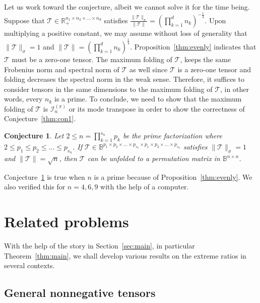 \documentclass[11pt]{article}
\newtheorem{conjecture}[theorem]{Conjecture}
\newcommand{\BB}{\mathbb{B}}
\newcommand{\R}{\mathbb{R}}
\newcommand{\II}{\mathcal{I}}
\newcommand{\TT}{\mathcal{T}}
\begin{document}
Let us work toward the conjecture, albeit we cannot solve it for the time being. Suppose that $\TT\in\R_+^{n_1\times n_2\times \dots\times n_d}$ satisfies $\frac{\|\TT\|_\sigma}{\|\TT\|}=\left(\prod_{k=1}^dn_k\right)^{-\frac{1}{4}}$. Upon multiplying a positive constant, we may assume without loss of generality that $\|\TT\|_\sigma=1$ and $\|\TT\|=\left(\prod_{k=1}^dn_k\right)^{\frac{1}{4}}$. Proposition~\ref{thm:evenly} indicates that $\TT$ must be a zero-one tensor. The maximum folding of $\TT$, keeps the same Frobenius norm and spectral norm of $\TT$ as well since $\TT$ is a zero-one tensor and folding decreases the spectral norm in the weak sense. Therefore, it suffices to consider tensors in the same dimensions to the maximum folding of $\TT$, in other words, every $n_k$ is a prime. To conclude, we need to show that the maximum folding of $\TT$ is $\II^{(\pi)}_n$ or its mode transpose in order to show the correctness of Conjecture~\ref{thm:con1}.
\begin{conjecture}\label{thm:con2}
Let $2\le n=\prod_{k=1}^{s_n} p_k$ be the prime factorization where $2\le p_1\le p_2\le \dots \le p_{s_n}$. If $\TT\in\BB^{p_1\times p_2\times \dots \times p_{s_n}\times p_1 \times p_2\times\dots\times p_{s_n}}$ satisfies $\|\TT\|_\sigma=1$ and $\|\TT\|=\sqrt{n}$, then $\TT$ can be unfolded to a permutation matrix in $\BB^{n\times n}$.
\end{conjecture}

Conjecture~\ref{thm:con2} is true when $n$ is a prime because of Proposition~\ref{thm:evenly}. We also verified this for $n=4,6,9$ with the help of a computer.


\section{Related problems}\label{sec:other}

With the help of the story in Section~\ref{sec:main}, in particular Theorem~\ref{thm:main}, we shall develop various results on the extreme ratios in several contexts.

\subsection{General nonnegative tensors}
\end{document}
